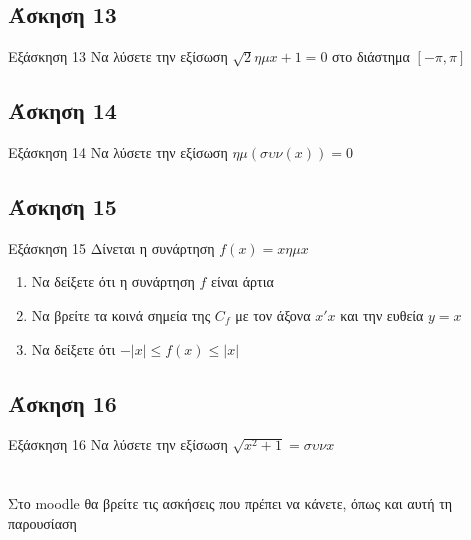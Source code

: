 \documentclass[greek]{beamer}
\begin{document}
\subsection{Άσκηση 13}
\begin{frame}[label=Άσκηση13]{Εξάσκηση 13}
 Να λύσετε την εξίσωση $\sqrt{2}ημx+1=0$ στο διάστημα $[-π,π]$

\end{frame}

\subsection{Άσκηση 14}
\begin{frame}[label=Άσκηση14]{Εξάσκηση 14}
 Να λύσετε την εξίσωση $ημ(συν(x))=0$

\end{frame}

\subsection{Άσκηση 15}
\begin{frame}[label=Άσκηση15]{Εξάσκηση 15}
 Δίνεται η συνάρτηση $f(x)=xημx$
 \begin{enumerate}
  \item<1-> Να δείξετε ότι η συνάρτηση $f$ είναι άρτια
  \item<2-> Να βρείτε τα κοινά σημεία της $C_f$ με τον άξονα $x'x$ και την ευθεία $y=x$
  \item<3-> Να δείξετε ότι $-|x|\le f(x) \le |x|$
 \end{enumerate}
\end{frame}

\subsection{Άσκηση 16}
\begin{frame}[label=Άσκηση16]{Εξάσκηση 16}
 Να λύσετε την εξίσωση $\sqrt{x^2+1}=συνx$

\end{frame}

\section{}
\begin{frame}
 Στο moodle θα βρείτε τις ασκήσεις που πρέπει να κάνετε, όπως και αυτή τη παρουσίαση
\end{frame}

\end{document}
